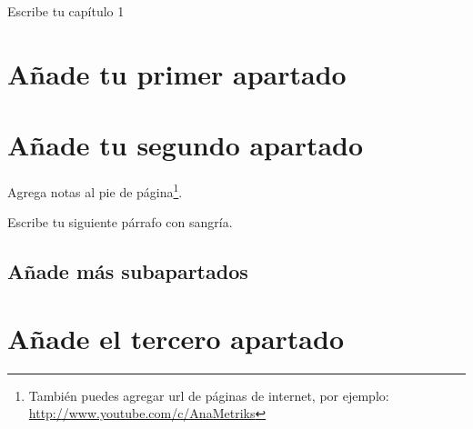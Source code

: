 \setlength{\parskip}{1em}

Escribe tu capítulo 1


\section{Añade tu primer apartado}
\setlength{\parindent}{0em}

\section{Añade tu segundo apartado}
\setlength{\parindent}{0em}

Agrega notas al pie de página\footnote{También puedes agregar url de páginas de internet, por ejemplo: \url{http://www.youtube.com/c/AnaMetriks}}.

\setlength{\parindent}{2em}
Escribe tu siguiente párrafo con sangría.



\subsection{Añade más subapartados}
\setlength{\parindent}{0em}

\section{Añade el tercero apartado}
\setlength{\parindent}{0em}